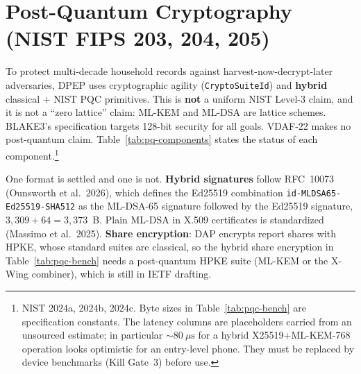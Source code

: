 \documentclass[10pt,twoside,openany]{book}
\theoremstyle{dpepstyle}
\begin{document}
\section{Post-Quantum Cryptography (NIST FIPS 203, 204, 205)}
\label{sec:pqc}

To protect multi-decade household records against harvest-now-decrypt-later adversaries, DPEP uses cryptographic agility (\texttt{CryptoSuiteId}) and \textbf{hybrid} classical + NIST PQC primitives. This is \textbf{not} a uniform NIST Level-3 claim, and it is not a ``zero lattice'' claim: ML-KEM and ML-DSA are lattice schemes. BLAKE3's specification targets 128-bit security for all goals. VDAF-22 makes no post-quantum claim. Table~\ref{tab:pq-components} states the status of each component.\footnote{NIST 2024a, 2024b, 2024c. Byte sizes in Table~\ref{tab:pqc-bench} are specification constants. The latency columns are placeholders carried from an unsourced estimate; in particular $\sim 80\ \mu\text{s}$ for a hybrid X25519+ML-KEM-768 operation looks optimistic for an entry-level phone. They must be replaced by device benchmarks (Kill Gate~3) before use.}

One format is settled and one is not. \textbf{Hybrid signatures} follow RFC~10073 (Ounsworth et al.\ 2026), which defines the Ed25519 combination \texttt{id-MLDSA65-Ed25519-SHA512} as the ML-DSA-65 signature followed by the Ed25519 signature, $3{,}309 + 64 = 3{,}373$~B. Plain ML-DSA in X.509 certificates is standardized (Massimo et al.\ 2025). \textbf{Share encryption}: DAP encrypts report shares with HPKE, whose standard suites are classical, so the hybrid share encryption in Table~\ref{tab:pqc-bench} needs a post-quantum HPKE suite (ML-KEM or the X-Wing combiner), which is still in IETF drafting.
\end{document}
